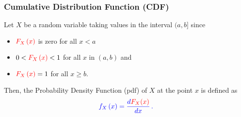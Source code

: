 \documentclass[notes=show,smaller,handout]{beamer}\usepackage[]{graphicx}\usepackage[]{color}
\newenvironment{stepitemize}{\begin{itemize}[<+->]}{\end{itemize} }
\begin{document}
\begin{frame}%

\frametitle{Cumulative Distribution Function (CDF)}

Let $X$ be a random variable taking values in the interval $(a,b]$ since
\vspace{0.75cm}

\begin{stepitemize}
\item $\color{red}F_{X}\left( x\right)\color{black} $ is zero for all $x<a$ \vspace{0.25cm}
\item $0<\color{red}F_{X}\left( x\right)\color{black}<1 $ for all $x$ in $(a,b)$ and \vspace{0.25cm}
\item $\color{red}F_{X}\left( x\right)\color{black}=1 $ for all $x\geq b$.
\end{stepitemize}

\vspace{0.75cm}

Then, the Probability Density Function (\color{blue}pdf\color{black}) of $X$ at the point $x$ is defined as
\begin{equation*}
\color{blue}{f_{X}\left( x\right) =\frac{d\color{red}F_{X}(x)\color{black}}{dx}}\,.
\end{equation*}%

\end{frame}%

\end{document}
